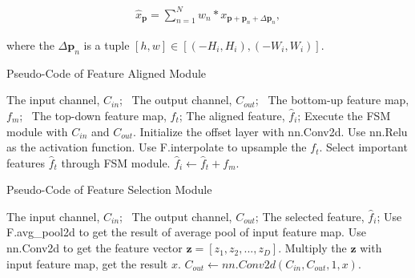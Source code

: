 \begin{equation}
    \begin{aligned}
    \hat{x}_\textbf{p}= \sum_{n = 1}^{N}w_n * x_{\textbf{p}+\textbf{p}_n+\Delta\textbf{p}_n},
    \label{con:famConvolution}
    \end{aligned}
\end{equation}

where the $\Delta\textbf{p}_n$ is a tuple $[h, w] \in [(-H_i, H_i), (-W_i, W_i)]$.

\begin{algorithm}[htbp]
	\caption{Pseudo-Code of Feature Aligned Module} 
	\label{alg1} 
	\begin{algorithmic}
		\REQUIRE 
        The input channel, $C_{in}$;
		\ The output channel, $C_{out}$;
		\ The bottom-up feature map, $f_m$;
		\ The top-down feature map, $f_t$;
		\ENSURE 
        The aligned feature, $\hat{f}_i$;
		\STATE Execute the FSM module with $C_{in}$ and $C_{out}$.
		\STATE Initialize the offset layer with nn.Conv2d.
		\STATE Use nn.Relu as the activation function.
        \STATE Use F.interpolate to upsample the $f_t$.
		\ENDIF 
		\STATE Select important features $\hat{f}_t$ through FSM module.
		\STATE $\hat{f}_i \gets \hat{f}_t + f_m$.

	\end{algorithmic} 
\end{algorithm}

\begin{algorithm}[htbp]
	\caption{Pseudo-Code of Feature Selection Module} 
	\label{alg2} 
	\begin{algorithmic}
		\REQUIRE 
        The input channel, $C_{in}$;
		\ The output channel, $C_{out}$;
		\ENSURE The selected feature, $\hat{f}_i$;
		\STATE Use F.avg\_pool2d to get the result of average pool of input feature map.
		\STATE Use nn.Conv2d to get the feature vector $\textbf{z} =  [z_1, z_2, ..., z_D]$.
		\STATE Multiply the $\textbf{z}$ with input feature map, get the result $x$.
		\STATE $C_{out} \gets nn.Conv2d(C_{in}, C_{out}, 1, x)$. 

	\end{algorithmic} 
\end{algorithm}


